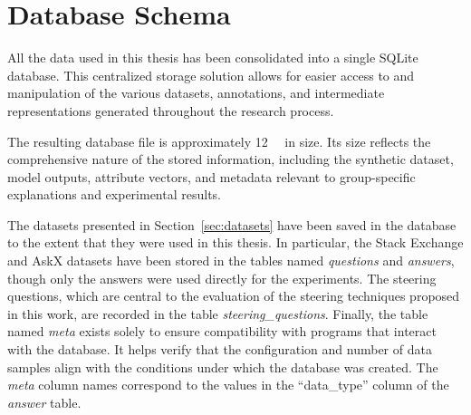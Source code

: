 \section{Database Schema}
\label{sec:appendix:databaseSchema}
All the data used in this thesis has been consolidated into a single SQLite database. This centralized storage solution allows for easier access to and manipulation of the various datasets, annotations, and intermediate representations generated throughout the research process.

The resulting database file is approximately \SI{12}{\giga\byte} in size. Its size reflects the comprehensive nature of the stored information, including the synthetic dataset, model outputs, attribute vectors, and metadata relevant to group-specific explanations and experimental results.

The datasets presented in Section~\ref{sec:datasets} have been saved in the database to the extent that they were used in this thesis. In particular, the Stack Exchange and AskX datasets have been stored in the tables named \textit{questions} and \textit{answers}, though only the answers were used directly for the experiments. The steering questions, which are central to the evaluation of the steering techniques proposed in this work, are recorded in the table \textit{steering\_questions}. Finally, the table named \textit{meta} exists solely to ensure compatibility with programs that interact with the database. It helps verify that the configuration and number of data samples align with the conditions under which the database was created. The \textit{meta} column names correspond to the values in the \enquote{data\_type} column of the \textit{answer} table.

